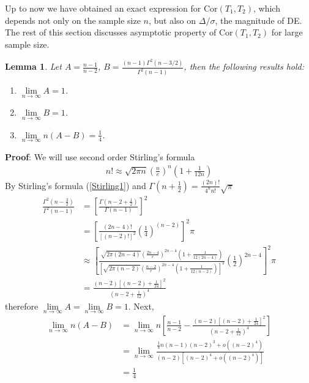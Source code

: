 \documentclass[12pt, a4paper]{article}
\newtheorem{lemma}{Lemma}
\begin{document}
	Up to now we have obtained an exact expression for $\text{Cor}(T_1, T_2)$, which depends not only on
	the sample size $n$, but also on $\Delta/\sigma$, the magnitude of DE. The rest of this section
	discusses asymptotic  property of $\text{Cor}(T_1, T_2)$ for large sample size.
	\begin{lemma}\label{lemmaLimit}
		Let $A = \frac{n-1}{n-2}$, $B= \frac{(n-1)\Gamma^2(n-3/2)}{\Gamma^2(n-1)}$, then the following
		results hold:
		\begin{enumerate}
			\item $\lim\limits_{n\rightarrow \infty} A = 1$.
			\item $\lim\limits_{n\rightarrow \infty} B = 1$.
			\item $\lim\limits_{n\rightarrow \infty} n(A-B) = \frac{1}{4}$. 
		\end{enumerate}
	\end{lemma}
	\textbf{Proof}: We will use second order Stirling's formula
	\begin{align}\label{Stirling1}
		n! \approx \sqrt{2\pi n}\left(\frac{n}{e}\right)^n(1 + \frac{1}{12n})
	\end{align}
	By Stirling's formula (\ref{Stirling1}) and  $\Gamma(n + \frac{1}{2}) =
	\frac{(2n)!}{4^nn!}\sqrt{\pi}$ 
	\begin{align*}
		\frac{\Gamma^2(n - \frac{3}{2}) }{\Gamma^2(n-1)} & =\left[\frac{\Gamma(n -2 +
			\frac{1}{2})}{\Gamma(n-1)}\right]^2\\
		&  = \left[\frac{(2n-4)!}{[(n-2)!]^2}\left(\frac{1}{4}\right)^{(n-2)}\right]^2\pi\\
		& \approx \left[\frac{\sqrt{2\pi(2n-4)}\left(\frac{2n-4}{e}\right)^{2n-4}\left(1 +
			\frac{1}{12(2n-4)}\right)}{\left[\sqrt{2\pi(n-2)}\left(\frac{n-2}{e}\right)^{2n-4}\left(1 +
			\frac{1}{12(n-2)}\right)\right]^2}\left(\frac{1}{2}\right)^{2n-4}\right]^2\pi \\
		& = \frac{(n-2)\left[(n-2) + \frac{1}{24}\right]^2}{(n-2 + \frac{1}{12})^4}
	\end{align*}
	therefore $\lim\limits _{n\rightarrow\infty}A = \lim\limits_{n\rightarrow\infty}B = 1$. Next, 
	\begin{align*}
		\lim\limits_{n\rightarrow \infty} n(A-B)& =\lim\limits_{n\rightarrow \infty} n\left[\frac{n-1}{n-2}
		- \frac{(n-2)\left[(n-2) + \frac{1}{24}\right]^2}{(n-2 + \frac{1}{12})^4}\right]\\
		& = \lim\limits_{n\rightarrow \infty}  \frac{\frac{1}{4} n(n-1)(n-2)^3 +
			o\left((n-2)^4\right)}{(n-2)\left[(n-2)^4 +  o\left((n-2)^4\right)\right]}\\
		&= \frac{1}{4}
	\end{align*}
\end{document}
